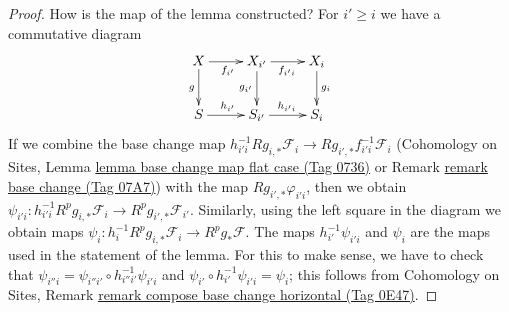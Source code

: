 \documentclass{amsart}
\theoremstyle{plain}
\theoremstyle{definition}
\theoremstyle{remark}
\numberwithin{equation}{subsection}
\begin{document}
\begin{proof}
How is the map of the lemma constructed?
For $i' \geq i$ we have a commutative diagram
$$
\xymatrix{
X \ar[r]_{f_{i'}} \ar[d]_g &
X_{i'} \ar[r]_{f_{i'i}} \ar[d]_{g_{i'}} &
X_i \ar[d]^{g_i} \\
S \ar[r]^{h_{i'}} &
S_{i'} \ar[r]^{h_{i'i}} &
S_i
}
$$
If we combine the base change map
$h_{i'i}^{-1}Rg_{i, *}\mathcal{F}_i \to Rg_{i', *}f_{i'i}^{-1}\mathcal{F}_i$
(Cohomology on Sites, Lemma
\href{https://stacks.math.columbia.edu/tag/0736}{lemma base change map flat case (Tag 0736)} or
Remark \href{https://stacks.math.columbia.edu/tag/07A7}{remark base change (Tag 07A7)})
with the map $Rg_{i', *}\varphi_{i'i}$, then we obtain
$\psi_{i'i} : h_{i' i}^{-1} R^p g_{i, *} \mathcal{F}_i \to
R^pg_{i', *} \mathcal{F}_{i'}$. Similarly, using the left square
in the diagram we obtain maps
$\psi_i : h_i^{-1}R^pg_{i, *}\mathcal{F}_i \to R^pg_*\mathcal{F}$.
The maps $h_{i'}^{-1}\psi_{i'i}$ and $\psi_i$ are the maps used in
the statement of the lemma. For this to make sense, we have to check that
$\psi_{i''i} = \psi_{i''i'} \circ h_{i''i'}^{-1}\psi_{i'i}$ and
$\psi_{i'} \circ h_{i'}^{-1}\psi_{i'i} = \psi_i$; this follows
from Cohomology on Sites, Remark
\href{https://stacks.math.columbia.edu/tag/0E47}{remark compose base change horizontal (Tag 0E47)}.


\end{proof}
\end{document}

